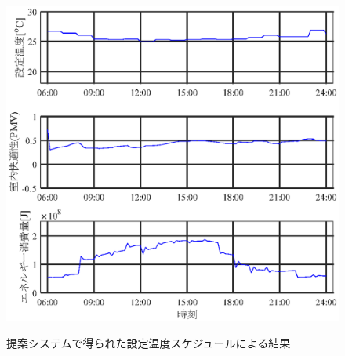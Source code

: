\begin{figure}[htbp]
\begin{center}
\begin{minipage}{0.5\textwidth}
\begin{center}
      \end{center}
    \end{minipage}
    \begin{minipage}{0.5\textwidth}
      \begin{center}
        \includegraphics[width=1.0\textwidth,keepaspectratio=true]{fig/sim_result_schedule_c.eps}\\\vspace{-2mm}{スケジュール C (室内快適性が最も悪い解) }
      \end{center}
    \end{minipage}
  \end{center}
  \vspace{-2mm}
  \caption{提案システムで得られた設定温度スケジュールによる結果}
  \label{fig::sim_result_schedule}
\end{figure}


